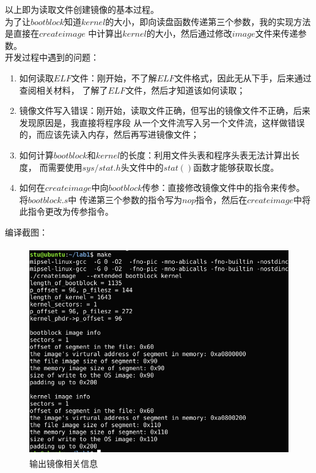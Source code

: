 \documentclass[UTF8,noindent]{ctexart}
\begin{document}
以上即为读取文件创建镜像的基本过程。\\

为了让$bootblock$知道$kernel$的大小，即向读盘函数传递第三个参数，我的实现方法是直接在$createimage$
中计算出$kernel$的大小，然后通过修改$image$文件来传递参数。\\

开发过程中遇到的问题：
\begin{enumerate}
	\item 如何读取$ELF$文件：刚开始，不了解$ELF$文件格式，因此无从下手，后来通过查阅相关材料，
	了解了$ELF$文件，然后才知道该如何读取；
	\item 镜像文件写入错误：刚开始，读取文件正确，但写出的镜像文件不正确，后来发现原因是，我直接将程序段
	从一个文件流写入另一个文件流，这样做错误的，而应该先读入内存，然后再写进镜像文件；
	\item 如何计算$bootblock$和$kernel$的长度：利用文件头表和程序头表无法计算出长度，
	而需要使用$sys/stat.h$头文件中的$stat()$函数才能够获取长度。
	\item 
	如何在$createimage$中向$bootblock$传参：直接修改镜像文件中的指令来传参。将$bootblock.s$中
	传递第三个参数的指令写为$nop$指令，然后在$createimage$中将此指令更改为传参指令。
\end{enumerate}

编译截图：
\begin{figure}[H]
	\centering\includegraphics[height = 9cm, width = 
	13cm]{fig/4.1.png}\caption{输出镜像相关信息}
\end{figure}
\end{document}
